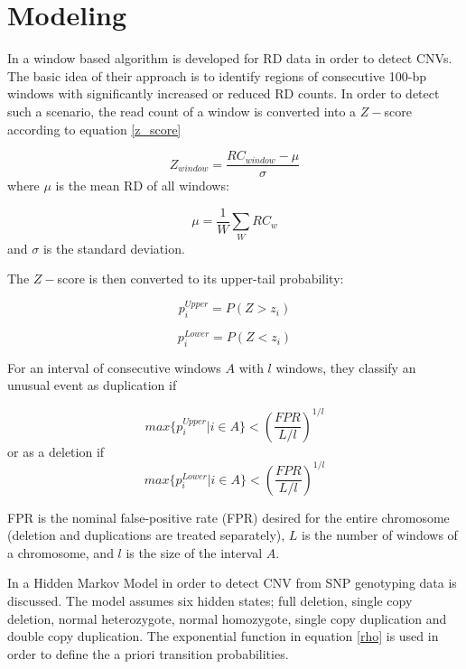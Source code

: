 \section{Modeling}

In \cite{yoon2009} a window based algorithm is developed for RD data in order to detect CNVs.
The basic idea of their approach is to identify regions of consecutive 100-bp windows with significantly increased or reduced RD counts. In order to detect such a scenario, 
the read count of a window is converted into a $Z-$score according to equation \ref{z_score}

\begin{equation}
Z_{window} = \frac{RC_{window} - \mu}{\sigma}
\label{z_score}
\end{equation}
where $\mu$ is the mean RD of all windows:

\begin{equation}
\mu = \frac{1}{W}\sum_{W} RC_w
\end{equation}
and $\sigma$ is the standard deviation.

The $Z-$score is then converted to its upper-tail probability:

\begin{equation}
p_{i}^{Upper} = P(Z>z_i)
\end{equation}

\begin{equation}
p_{i}^{Lower} = P(Z<z_i)
\end{equation}

For an interval of consecutive windows $A$ with $l$ windows, they classify  an unusual event as duplication if 

\begin{equation}
max\{p_{i}^{Upper} | i \in A\} < \left(\frac{FPR}{L/l}\right)^{1/l}
\end{equation}
or as a deletion if 
\begin{equation}
max\{p_{i}^{Lower} | i \in A\} < \left(\frac{FPR}{L/l}\right)^{1/l}
\end{equation}

FPR is the nominal false-positive rate (FPR) desired for the entire
chromosome (deletion and duplications are treated separately), $L$ is the number of windows of a chromosome, and $l$ is the size of the interval $A$.

In \cite{coella2007} a Hidden Markov Model in order to detect 
CNV from SNP genotyping data is discussed. The model assumes six hidden states; full deletion, single copy deletion, normal heterozygote, normal homozygote, single copy duplication and double copy duplication. The exponential function in equation \ref{rho} is used in order to define the a priori transition probabilities. 

